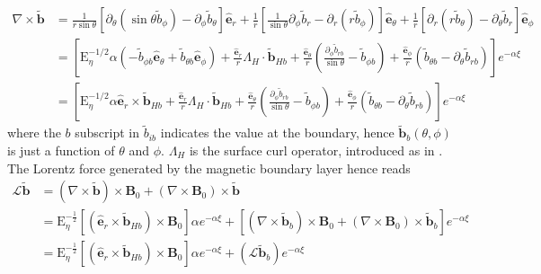 \begin{equation}
\begin{aligned}
    \nabla\times \widetilde{\mathbf{b}} &= \frac{1}{r\sin\theta} \left[\partial_\theta(\sin\theta \widetilde{b}_\phi) - \partial_\phi \widetilde{b}_\theta\right] \hat{\mathbf{e}}_r 
    + \frac{1}{r} \left[\frac{1}{\sin\theta}\partial_\phi \widetilde{b}_r - \partial_r(r\widetilde{b}_\phi)\right] \hat{\mathbf{e}}_\theta
    + \frac{1}{r} \left[\partial_r(r \widetilde{b}_\theta) - \partial_\theta \widetilde{b}_r\right] \hat{\mathbf{e}}_\phi \\ 
    &= \left[\mathrm{E}_\eta^{-1/2} \alpha \left(-\widetilde{b}_{\phi b} \hat{\mathbf{e}}_\theta + \widetilde{b}_{\theta b} \hat{\mathbf{e}}_\phi\right) + \frac{\hat{\mathbf{e}}_r}{r}\Lambda_H\cdot \widetilde{\mathbf{b}}_{Hb} + \frac{\hat{\mathbf{e}}_\theta}{r} \left(\frac{\partial_\phi \widetilde{b}_{rb}}{\sin\theta} - \widetilde{b}_{\phi b}\right) + \frac{\hat{\mathbf{e}}_\phi}{r} \left(\widetilde{b}_{\theta b} - \partial_\theta \widetilde{b}_{rb}\right)\right] e^{-\alpha \xi} \\ 
    &= \left[\mathrm{E}_\eta^{-1/2} \alpha \hat{\mathbf{e}}_r \times \widetilde{\mathbf{b}}_{Hb} + \frac{\hat{\mathbf{e}}_r}{r}\Lambda_H\cdot \widetilde{\mathbf{b}}_{Hb} + \frac{\hat{\mathbf{e}}_\theta}{r} \left(\frac{\partial_\phi \widetilde{b}_{rb}}{\sin\theta} - \widetilde{b}_{\phi b}\right) + \frac{\hat{\mathbf{e}}_\phi}{r} \left(\widetilde{b}_{\theta b} - \partial_\theta \widetilde{b}_{rb}\right)\right] e^{-\alpha \xi}
\end{aligned}
\end{equation}
%
where the $b$ subscript in $\widetilde{b}_{ib}$ indicates the value at the boundary, hence $\widetilde{\mathbf{b}}_{b}(\theta, \phi)$ is just a function of $\theta$ and $\phi$. $\Lambda_H$ is the surface curl operator, introduced as in \citet{backus_poloidal_1986}. The Lorentz force generated by the magnetic boundary layer hence reads
%
\begin{equation}
\begin{aligned}
    \mathcal{L} \widetilde{\mathbf{b}} &= (\nabla\times \widetilde{\mathbf{b}}) \times \mathbf{B}_0 + (\nabla\times \mathbf{B}_0) \times \widetilde{\mathbf{b}} \\
    &= \mathrm{E}_\eta^{-\frac{1}{2}} \left[(\hat{\mathbf{e}}_r \times \widetilde{\mathbf{b}}_{Hb}) \times \mathbf{B}_0\right] \alpha e^{-\alpha \xi}  + \left[(\nabla\times \widetilde{\mathbf{b}}_b) \times \mathbf{B}_0 + (\nabla\times \mathbf{B}_0)\times \widetilde{\mathbf{b}}_b\right] e^{-\alpha \xi} \\ 
    &= \mathrm{E}_\eta^{-\frac{1}{2}} \left[(\hat{\mathbf{e}}_r \times \widetilde{\mathbf{b}}_{Hb}) \times \mathbf{B}_0\right] \alpha e^{-\alpha \xi} + \left(\mathcal{L} \widetilde{\mathbf{b}}_b\right) e^{-\alpha \xi}
\end{aligned}
\end{equation}
